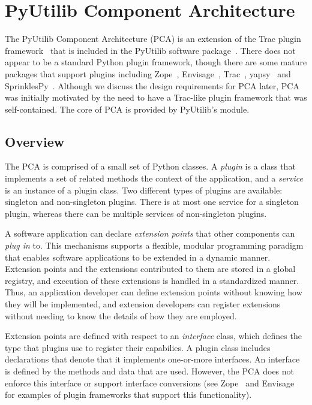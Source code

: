 
\chapter{PyUtilib Component Architecture}

\label{chap:pca}

The PyUtilib Component Architecture (PCA) is an extension of the Trac
plugin framework~\cite{Trac} that is included in the PyUtilib software
package~\cite{PyUtilib}.  There does not appear to be a standard
Python plugin framework, though there are some mature packages that
support plugins including Zope~\cite{Zope}, Envisage~\cite{Envisage},
Trac~\cite{Trac}, yapsy~\cite{yapsy} and SprinklesPy~\cite{SprinklesPy}.
Although we discuss the design requirements for PCA later, PCA was
initially motivated by the need to have a Trac-like plugin framework that was
self-contained.  The core of PCA is provided by PyUtilib's
 module.

\section{Overview}

The PCA is comprised of a small set of Python classes. A \textit{plugin}
is a class that implements a set of related methods the context of the
application, and a \textit{service} is an instance of a plugin class. Two
different types of plugins are available: singleton and non-singleton
plugins. There is at most one service for a singleton plugin, whereas
there can be multiple services of non-singleton plugins.

A software application can declare \textit{extension points} that other
components can \textit{plug in} to. This mechanisms supports a flexible,
modular programming paradigm that enables software applications to
be extended in a dynamic manner. Extension points and the extensions
contributed to them are stored in a global registry, and execution of
these extensions is handled in a standardized manner. Thus, an application
developer can define extension points without knowing how they will be
implemented, and extension developers can register extensions without
needing to know the details of how they are employed.

Extension points are defined with respect to an \textit{interface} class, 
which defines the type that plugins use to register their capabilies.
A plugin class includes declarations that denote that it implements
one-or-more interfaces. An interface is defined by the methods and data
that are used. However, the PCA does not enforce
this interface or support interface conversions (see Zope~\cite{Zope}
and Envisage~\cite{Envisage} for examples of plugin frameworks that
support this functionality).


